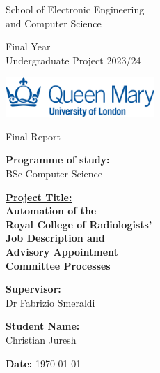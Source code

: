 \setlength{\columnsep}{1cm}
\setlength{\columnseprule}{1pt}
\begin{titlepage}
\begin{multicols*}{2}

\large
\noindent
School of Electronic Engineering 
\\and Computer Science

\vfill

\noindent
Final Year 
\\Undergraduate Project 2023/24

\vspace{1cm}
\noindent
\includegraphics[width=0.425\textwidth]{images/qmul-logo.jpg}  


\columnbreak

\noindent
Final Report

\vfill

\noindent
\textbf{Programme of study:}
\\BSc Computer Science

\vfill
\noindent
\normalsize
\underline{\textbf{Project Title:}}
\large
\\\textbf{Automation of the \\Royal College of Radiologists' \\Job Description and \\Advisory Appointment \\Committee Processes}

\large
\vfill
\noindent
\textbf{Supervisor:}
\\Dr Fabrizio Smeraldi

\vfill
\noindent
\textbf{Student Name:}
\\Christian Juresh

\vspace{0pt plus 2fill} 

\noindent
\textbf{Date:} \today

\end{multicols*}
\end{titlepage}
\restoregeometry